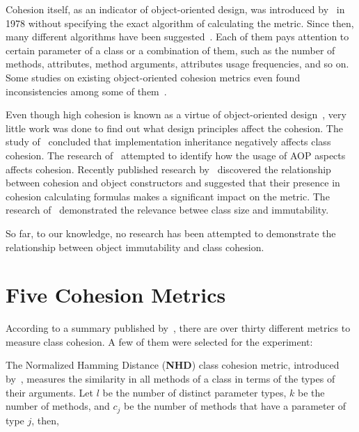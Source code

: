 \documentclass[sigconf,10pt,nonacm=true]{acmart}
\begin{document}
Cohesion itself, as an indicator of object-oriented design, was introduced
by~\citet{yourdon78} in 1978 without specifying the exact algorithm of
calculating the metric. Since then, many different algorithms
have been suggested~\citet{izadkhah17}.
Each of them pays attention to certain
parameter of a class or a combination of them, such as the number of methods,
attributes, method arguments, attributes usage frequencies, and so on.
Some studies on existing object-oriented cohesion metrics
even found inconsistencies among some of them~\citep{salem2011,gupta1997}.

Even though high cohesion is known as a virtue of object-oriented design~\citep{kabaili01},
very little work was done to find out what design principles affect
the cohesion. The study of~\citet{patidar2013} concluded that implementation
inheritance negatively affects class cohesion. The research of~\citet{guyomarc2005}
attempted to identify how the usage of AOP aspects affects cohesion.
Recently published research by~\citet{yb-ctors} discovered the relationship
between cohesion and object constructors and suggested that their presence
in cohesion calculating formulas makes a significant impact on the metric.
The research of~\citet{yb-size} demonstrated the relevance betwee class size
and immutability.

So far, to our knowledge, no research has been attempted
to demonstrate the relationship between object immutability and class cohesion.

\section{Five Cohesion Metrics}

According to a summary published by~\citet{izadkhah17},
there are over thirty different metrics to measure
class cohesion. A few of them were selected
for the experiment:

The Normalized Hamming Distance (\textbf{NHD}) class cohesion metric,
introduced by~\citet{counsell06},
measures the similarity in all methods of a class in terms of
the types of their arguments. Let $l$ be the number of
distinct parameter types, $k$ be the number of methods,
and $c_j$ be the number of methods that have a parameter of type $j$,
then,
\end{document}
